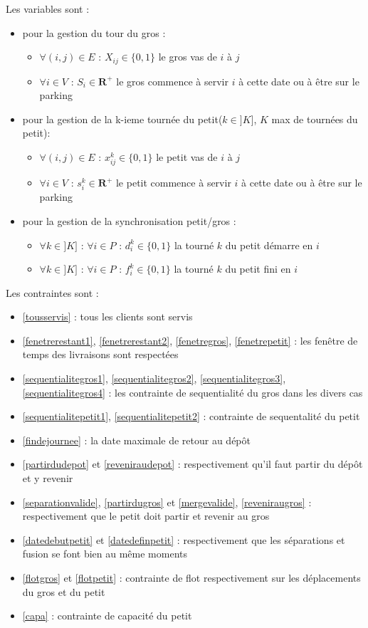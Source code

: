 \documentclass[12pt,a4paper,fleqn]{article}
\begin{document}
\clearpage
Les variables sont :
\begin{itemize}
\item pour la gestion du tour du gros :
\begin{itemize}
\item $\forall (i,j) \in E \text{ : } X_{ij} \in \{0,1\}$ le gros vas de $i$ à $j$
\item $\forall i \in V \text{ : } S_i \in \mathbf{R}^+$ le gros commence à servir $i$ à cette date ou à être sur le parking
\end{itemize}
\item pour la gestion de la k-ieme tournée du petit($k \in ]K]$, $K$ max de tournées du petit):
\begin{itemize}
\item $\forall (i,j) \in E \text{ : } x_{ij}^k \in \{0,1\}$ le petit vas de $i$ à $j$
\item $\forall i \in V \text{ : } s_i^k \in \mathbf{R}^+$ le petit commence à servir $i$ à cette date ou à être sur le parking
\end{itemize}
\item pour la gestion de la synchronisation petit/gros :
\begin{itemize}
\item $\forall k \in ]K] \text{ : } \forall i \in P \text{ : } d^k_i \in \{0,1\}$ la tourné $k$ du petit démarre en $i$ 
\item $\forall k \in ]K] \text{ : } \forall i \in P \text{ : } f^k_i \in \{0,1\}$ la tourné $k$ du petit fini en $i$
\end{itemize}
\end{itemize}

Les contraintes sont :
\begin{itemize}
\item \ref{tousservis} : tous les clients sont servis
\item \ref{fenetrerestant1}, \ref{fenetrerestant2}, \ref{fenetregros}, \ref{fenetrepetit} : les fenêtre de temps des livraisons sont respectées
\item \ref{sequentialitegros1}, \ref{sequentialitegros2}, \ref{sequentialitegros3}, \ref{sequentialitegros4} : les contrainte de sequentialité du gros dans les divers cas
\item \ref{sequentialitepetit1}, \ref{sequentialitepetit2} : contrainte de sequentalité du petit
\item \ref{findejournee} : la date maximale de retour au dépôt
\item \ref{partirdudepot} et \ref{reveniraudepot} : respectivement qu'il faut partir du dépôt et y revenir
\item \ref{separationvalide}, \ref{partirdugros} et \ref{mergevalide}, \ref{reveniraugros} : respectivement que le petit doit partir et revenir au gros
\item \ref{datedebutpetit} et \ref{datedefinpetit} : respectivement que les séparations et fusion se font bien au même moments
\item \ref{flotgros} et \ref{flotpetit} : contrainte de flot respectivement sur les déplacements du gros et du petit
\item \ref{capa} : contrainte de capacité du petit 
\end{itemize}
\end{document}

